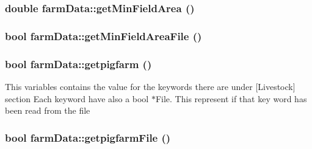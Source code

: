 \label{classfarm_data_a9fbfd725ccfe33d7288801d1e5c4d099}
\hypertarget{classfarm_data_a38e44d02817a78bc29aeb6c62bd57043}{
\subsubsection[{getMinFieldArea}]{\setlength{\rightskip}{0pt plus 5cm}double farmData::getMinFieldArea ()}}
\label{classfarm_data_a38e44d02817a78bc29aeb6c62bd57043}
\hypertarget{classfarm_data_aada4ac3a7cc5c6a40736bdeb3b126c30}{
\subsubsection[{getMinFieldAreaFile}]{\setlength{\rightskip}{0pt plus 5cm}bool farmData::getMinFieldAreaFile ()}}
\label{classfarm_data_aada4ac3a7cc5c6a40736bdeb3b126c30}
\hypertarget{classfarm_data_a91709d465272ff30629fe34c3584229f}{
\subsubsection[{getpigfarm}]{\setlength{\rightskip}{0pt plus 5cm}bool farmData::getpigfarm ()}}
\label{classfarm_data_a91709d465272ff30629fe34c3584229f}
This variables contains the value for the keywords there are under \mbox{[}Livestock\mbox{]} section Each keyword have also a bool $\ast$File. This represent if that key word has been read from the file \hypertarget{classfarm_data_aa209bdab6aefb7de3d008df5f7b2dca0}{
\subsubsection[{getpigfarmFile}]{\setlength{\rightskip}{0pt plus 5cm}bool farmData::getpigfarmFile ()}}
\label{classfarm_data_aa209bdab6aefb7de3d008df5f7b2dca0}
